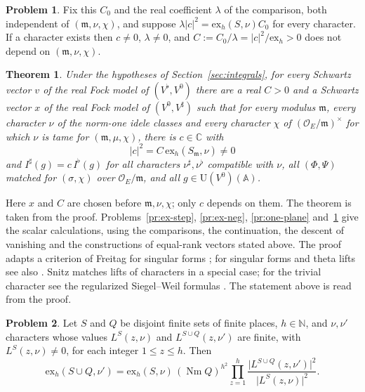 \documentclass[reqno]{amsart}
\theoremstyle{definition}
\newtheorem{problem}{Problem}[section]
\theoremstyle{plain}
\newtheorem{theorem}{Theorem}[section]
\newcommand{\C}{\mathbb C}
\newcommand{\A}{\mathbb A}
\newcommand{\Oc}{\mathcal O}
\newcommand{\Nm}{\operatorname{Nm}}
\newcommand{\ex}{\mathrm{ex}}
\newcommand{\U}{\mathrm{U}}
\newcommand{\Vs}{V^\sharp}
\newcommand{\Vb}{V^\flat}
\begin{document}
\begin{problem}\label{pr:assemble}
Fix this \(C_0\) and the real coefficient \(\lambda\) of the comparison, both independent of \((\mathfrak m, \nu, \chi)\), and suppose \(\lambda\lvert c\rvert^2 = \ex_h(S,\nu)C_0\) for every character.  If a character exists then \(c \ne 0\), \(\lambda \ne 0\), and \(C := C_0/\lambda = \lvert c\rvert^2/\ex_h > 0\) does not depend on \((\mathfrak m, \nu, \chi)\).
\end{problem}

\begin{theorem}\label{thm:exchange}
Under the hypotheses of Section~\ref{sec:integrals}, for every Schwartz vector \(v\) of the real Fock model of \((\Vb, V^0)\) there are a real \(C > 0\) and a Schwartz vector \(x\) of the real Fock model of \((V^0, \Vs)\) such that for every modulus \(\mathfrak m\), every character \(\nu\) of the norm-one idele classes and every character \(\chi\) of \((\Oc_E/\mathfrak m)^\times\) for which \(\nu\) is tame for \((\mathfrak m, \mu, \chi)\), there is \(c \in \C\) with
\[
  \lvert c\rvert^2 = C\,\ex_h(S_{\mathfrak m}, \nu) \ne 0
\]
and \(I^\sharp(g) = c\,I^\flat(g)\) for all characters \(\nu^\sharp, \nu^\flat\) compatible with \(\nu\), all \((\Phi, \Psi)\) matched for \((\sigma, \chi)\) over \(\Oc_E/\mathfrak m\), and all \(g \in \U(V^0)(\A)\).
\end{theorem}

Here \(x\) and \(C\) are chosen before \(\mathfrak m, \nu, \chi\); only \(c\) depends on them.  The theorem is taken from the proof.  Problems~\ref{pr:ex-step}, \ref{pr:ex-neg}, \ref{pr:one-plane} and~\ref{pr:assemble} give the scalar calculations, using the comparisons, the continuation, the descent of vanishing and the constructions of equal-rank vectors stated above.  The proof adapts a criterion of Freitag for singular forms \cite{Fr}; for singular forms and theta lifts see also \cite{Li97}.  Snitz \cite{Sn} matches lifts of characters in a special case; for the trivial character see the regularized Siegel--Weil formulas \cite{KR, Ic, GQT}.  The statement above is read from the proof.

\begin{problem}\label{pr:ex-ratio}
Let \(S\) and \(Q\) be disjoint finite sets of finite places, \(h \in \mathbb N\), and \(\nu, \nu'\) characters whose values \(L^S(z,\nu)\) and \(L^{S \cup Q}(z,\nu')\) are finite, with \(L^S(z,\nu) \ne 0\), for each integer \(1 \le z \le h\).  Then
\[
  \ex_h(S \cup Q, \nu') = \ex_h(S, \nu)\,(\Nm Q)^{h^2}\prod_{z=1}^h\frac{\lvert L^{S\cup Q}(z,\nu')\rvert^2}{\lvert L^S(z,\nu)\rvert^2} .
\]
\end{problem}
\end{document}
